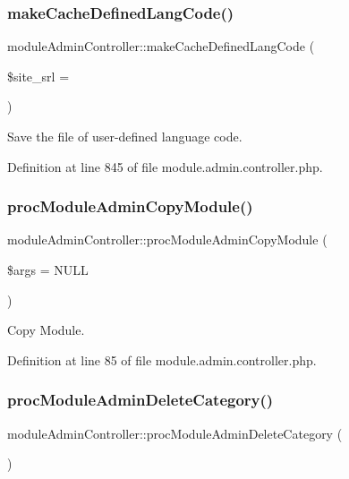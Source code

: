 \subsubsection{\texorpdfstring{make\+Cache\+Defined\+Lang\+Code()}{makeCacheDefinedLangCode()}}
{\footnotesize\ttfamily module\+Admin\+Controller\+::make\+Cache\+Defined\+Lang\+Code (\begin{DoxyParamCaption}\item[{}]{\$site\+\_\+srl = {} }\end{DoxyParamCaption})}



Save the file of user-\/defined language code. 



Definition at line 845 of file module.\+admin.\+controller.\+php.

\mbox{\label{classmoduleAdminController_a0540f21334c59ffebd82e08aa24114ab}} 
\subsubsection{\texorpdfstring{proc\+Module\+Admin\+Copy\+Module()}{procModuleAdminCopyModule()}}
{\footnotesize\ttfamily module\+Admin\+Controller\+::proc\+Module\+Admin\+Copy\+Module (\begin{DoxyParamCaption}\item[{}]{\$args = {\ttfamily NULL} }\end{DoxyParamCaption})}



Copy Module. 



Definition at line 85 of file module.\+admin.\+controller.\+php.

\mbox{\label{classmoduleAdminController_a49c74e7b6a1ad06aeea82a0f1993b147}} 
\subsubsection{\texorpdfstring{proc\+Module\+Admin\+Delete\+Category()}{procModuleAdminDeleteCategory()}}
{\footnotesize\ttfamily module\+Admin\+Controller\+::proc\+Module\+Admin\+Delete\+Category (\begin{DoxyParamCaption}{ }\end{DoxyParamCaption})}




